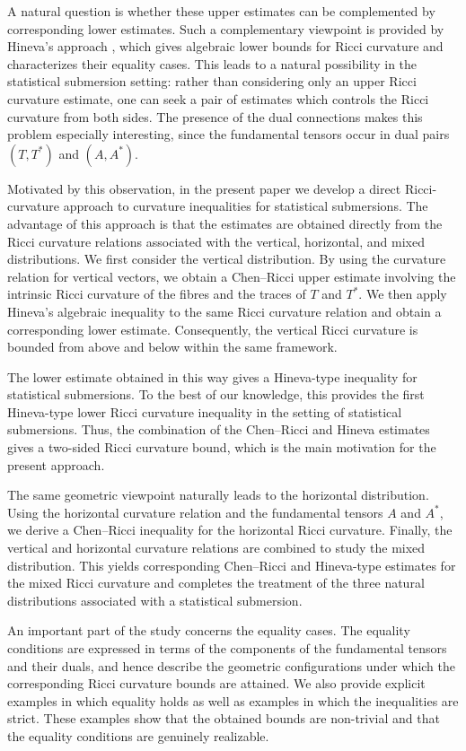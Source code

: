 \documentclass[10pt,a4paper]{article}
\theoremstyle{definition}
\theoremstyle{remark}
\numberwithin{equation}{section}
\begin{document}
A natural question is whether these upper estimates can be complemented
by corresponding lower estimates. Such a complementary viewpoint is
provided by Hineva's approach \cite{Hineva2008}, which gives algebraic
lower bounds for Ricci curvature and characterizes their equality cases.
This leads to a natural possibility in the statistical submersion setting:
rather than considering only an upper Ricci curvature estimate, one can
seek a pair of estimates which controls the Ricci curvature from both
sides. The presence of the dual connections makes this problem especially
interesting, since the fundamental tensors occur in dual pairs $(T,T^{*})$ and $(A,A^{*})$.

Motivated by this observation, in the present paper we develop a direct
Ricci-curvature approach to curvature inequalities for statistical
submersions. The advantage of this approach is that the estimates are
obtained directly from the Ricci curvature relations associated with the
vertical, horizontal, and mixed distributions. We first consider the
vertical distribution. By using the curvature relation for vertical
vectors, we obtain a Chen--Ricci upper estimate involving the intrinsic
Ricci curvature of the fibres and the traces of $T$ and $T^{*}$. We then
apply Hineva's algebraic inequality to the same Ricci curvature relation
and obtain a corresponding lower estimate. Consequently, the vertical
Ricci curvature is bounded from above and below within the same
framework.

The lower estimate obtained in this way gives a Hineva-type inequality
for statistical submersions. To the best of our knowledge, this provides
the first Hineva-type lower Ricci curvature inequality in the setting of
statistical submersions. Thus, the combination of the Chen--Ricci and
Hineva estimates gives a two-sided Ricci curvature bound, which is the
main motivation for the present approach.

The same geometric viewpoint naturally leads to the horizontal
distribution. Using the horizontal curvature relation and the
fundamental tensors $A$ and $A^{*}$, we derive a Chen--Ricci inequality
for the horizontal Ricci curvature. Finally, the vertical and horizontal
curvature relations are combined to study the mixed distribution. This
yields corresponding Chen--Ricci and Hineva-type estimates for the mixed
Ricci curvature and completes the treatment of the three natural
distributions associated with a statistical submersion.

An important part of the study concerns the equality cases. The equality
conditions are expressed in terms of the components of the fundamental
tensors and their duals, and hence describe the geometric configurations
under which the corresponding Ricci curvature bounds are attained. We
also provide explicit examples in which equality holds as well as
examples in which the inequalities are strict. These examples show that
the obtained bounds are non-trivial and that the equality conditions are
genuinely realizable.
\end{document}
